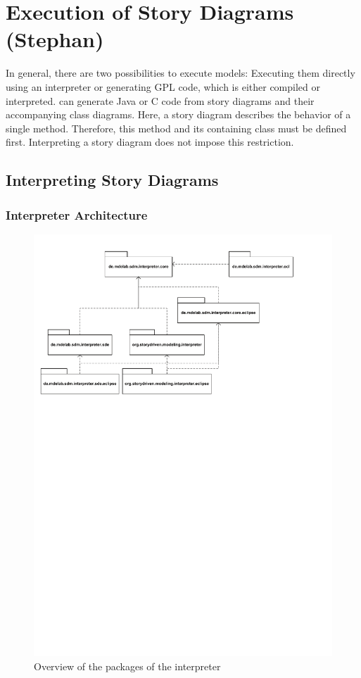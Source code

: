 \chapter{Execution of Story Diagrams (Stephan)}

In general, there are two possibilities to execute models: Executing them directly using an interpreter \cite{GHS09} or generating GPL code, which is either compiled or interpreted. \fuj can generate Java or C code from story diagrams and their accompanying class diagrams. Here, a story diagram describes the behavior of a single method. Therefore, this method and its containing class must be defined first. Interpreting a story diagram does not impose this restriction.


\section{Interpreting Story Diagrams}

\subsection{Interpreter Architecture}

\begin{figure}[htb]
  \centering
  \includegraphics[width=1.0\columnwidth]{./figures/interpreter_packages.pdf}
  \caption{Overview of the packages of the interpreter}
  \label{fig:interpreter_packages}
\end{figure}

